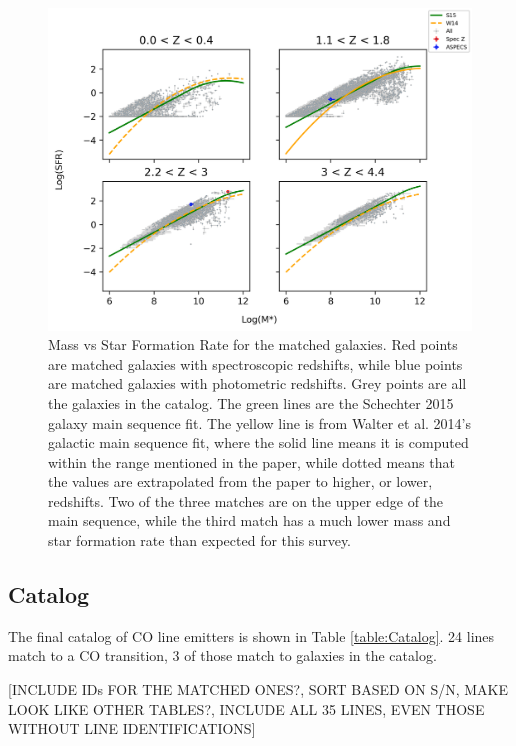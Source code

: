 \begin{figure}[tbp]
\centering \includegraphics[width=120mm]{Mstar_vs_SFR_all_closest_sep_1_0_sn_fid_60.png}
\caption{Mass vs Star Formation Rate for the matched galaxies. Red points are matched galaxies with spectroscopic redshifts, while blue points are matched galaxies with photometric redshifts. Grey points are all the galaxies in the catalog. The green lines are the Schechter 2015 galaxy main sequence fit. The yellow line is from Walter et al. 2014's galactic main sequence fit, where the solid line means it is computed within the range mentioned in the paper, while dotted means that the values are extrapolated from the paper to higher, or lower, redshifts. Two of the three matches are on the upper edge of the main sequence, while the third match has a much lower mass and star formation rate than expected for this survey.}
\label{fig:Cross_match}
\end{figure}

\subsection{Catalog}

The final catalog of CO line emitters is shown in Table \ref{table:Catalog}. 24 lines match to a CO transition, 3 of those match to galaxies in the catalog.

[INCLUDE IDs FOR THE MATCHED ONES?, SORT BASED ON S/N, MAKE LOOK LIKE OTHER TABLES?, INCLUDE ALL 35 LINES, EVEN THOSE WITHOUT LINE IDENTIFICATIONS]

